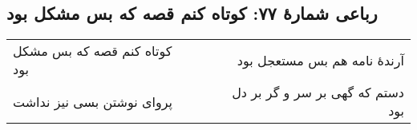 \begin{center}
\section*{رباعی شمارهٔ ۷۷: کوتاه کنم قصه که بس مشکل بود}
\label{sec:077}
\begin{longtable}{l p{0.5cm} r}
کوتاه کنم قصه که بس مشکل بود
&&
آرندهٔ نامه هم بس مستعجل بود
\\
پروای نوشتن بسی نیز نداشت
&&
دستم که گهی بر سر و گر بر دل بود
\\
\end{longtable}
\end{center}

